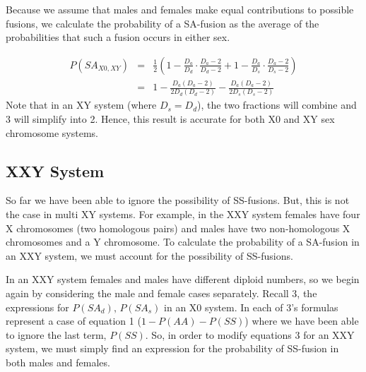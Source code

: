 \documentclass[12pt]{article}
\begin{document}
Because we assume that males and females make equal contributions to possible fusions, we calculate the probability of a SA-fusion as the average of the probabilities that such a fusion occurs in either sex.

    \begin{equation}
     \begin{array}{rcl}
        P(SA_{X0,XY}) & = & \frac{1}{2} (1 - \frac{D_a}{D_d} \cdot \frac{D_a - 2}{D_d - 2} + 1 - \frac{D_a}{D_s} \cdot \frac{D_a - 2}{D_s - 2}) \\
        & = & 1 - \frac{D_a  (D_a - 2)}{2 D_d  (D_d - 2)} - \frac{D_a  (D_a - 2)}{2 D_s  (D_s - 2)}
            \end{array}
    \end{equation}
Note that in an XY system (where $D_s = D_d$), the two fractions will combine and 3 will simplify into 2. 
Hence, this result is accurate for both X0 and XY sex chromosome systems.
 
\subsection{XXY System}
So far we have been able to ignore the possibility of SS-fusions. 
But, this is not the case in multi XY systems.
For example, in the XXY system females have four X chromosomes (two homologous pairs) and males have two non-homologous X chromosomes and a Y chromosome.
To calculate the probability of a SA-fusion in an XXY system, we must account for the possibility of SS-fusions. 

In an XXY system females and males have different diploid numbers, so we begin again by considering the male and female cases separately. 
Recall 3, the expressions for $P(SA_d) \mbox{, } P(SA_s)$ in an X0 system. 
In each of 3's formulas represent a case of equation 1 ($1-P(AA)-P(SS)$) where we have been able to ignore the last term, $P(SS)$.
So, in order to modify equations 3 for an XXY system, we must simply find an expression for the probability of SS-fusion in both males and females. 
\end{document}
